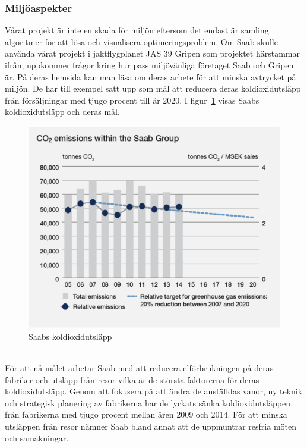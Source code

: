 \subsubsection{Miljöaspekter}
Vårat projekt är inte en skada för miljön eftersom det endast är samling algoritmer för att lösa och visualisera optimeringsproblem.  
\newline
\newline
Om Saab skulle använda vårat projekt i jaktflygplanet JAS 39 Gripen som projektet härstammar ifrån, uppkommer frågor kring hur pass miljövänliga företaget Saab och Gripen är. På deras hemsida \citep{saabimpact} kan man läsa om deras arbete för att minska avtrycket på miljön. De har till exempel satt upp som mål att reducera deras koldioxidutsläpp från försäljningar med tjugo procent till år 2020. I figur~\ref{fig:saabkoldioxid} visas Saabs koldioxidutsläpp och deras mål.   
\leavevmode
\begin{figure}[h]
	\centering
	\includegraphics[scale=1.5]{grafik/saabemissions.png}
	\caption{Saabs koldioxidutsläpp}\label{fig:saabkoldioxid}	
\end{figure} 
\\
För att nå målet arbetar Saab med att reducera elförbrukningen på deras fabriker och utsläpp från resor vilka är de största faktorerna för deras koldioxidutsläpp. Genom att fokusera på att ändra de anställdas vanor, ny teknik och strategisk planering av fabrikerna har de lyckats sänka koldioxidutsläppen från fabrikerna med tjugo procent mellan åren 2009 och 2014. För att minska utsläppen från resor nämner Saab bland annat att de uppmuntrar resfria möten och samåkningar.
